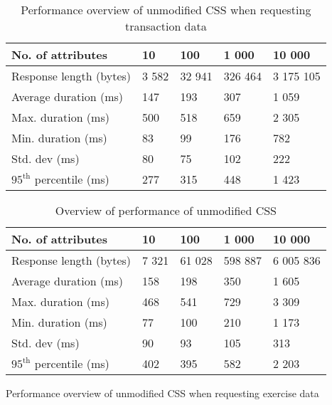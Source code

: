 \begin{table}[H]
\begin{subtable}{1.0\textwidth}
\centering
\begin{tabular}{lllll}
\textbf{No. of attributes} & \textbf{10} & \textbf{100} & \textbf{1 000} & \textbf{10 000} \\ \hline
Response length (bytes)    & 3 582        & 32 941      & 326 464        & 3 175 105        \\
Average duration (ms)      & 147          & 193         & 307        & 1 059        \\
Max. duration (ms)         & 500          & 518         & 659           & 2 305           \\
Min. duration (ms)         & 83           & 99          & 176           & 782            \\
Std. dev (ms)              & 80           & 75          & 102        & 222         \\
$95^{\text{th}}$ percentile (ms)       & 277          & 315         & 448         & 1 423     
\end{tabular}
\caption{Performance overview of unmodified \acrshort{CSS} when requesting transaction data}
\label{table:results-vanilla-json}
\end{subtable}
\end{table}%
\begin{table}[H]\ContinuedFloat

\begin{subtable}{1.0\textwidth}
\centering
\begin{tabular}{lllll}
\textbf{No. of attributes} & \textbf{10} & \textbf{100} & \textbf{1 000} & \textbf{10 000} \\ \hline
Response length (bytes)    & 7 321       & 61 028       & 598 887        & 6 005 836       \\
Average duration (ms)      & 158         & 198          & 350           & 1 605         \\
Max. duration (ms)         & 468         & 541          & 729            & 3 309           \\
Min. duration (ms)         & 77          & 100          & 210            & 1 173            \\
Std. dev (ms)              & 90          & 93           & 105         & 313          \\
$95^{\text{th}}$ percentile (ms)       & 402         & 395          & 582         & 2 203        
\end{tabular}
\caption{Performance overview of unmodified \acrshort{CSS} when requesting exercise data}
\label{table:results-vanilla-xml}
\end{subtable}

\caption{Overview of performance of unmodified \acrshort{CSS}}
\label{table:results-exp1-unmodified}

\end{table}